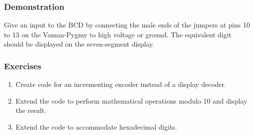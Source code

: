 \subsubsection{Demonstration}
Give an input to the BCD by connecting the male ends of the jumpers at pins 10
to 13 on the Vaman-Pygmy to high voltage or ground. The equivalent digit should
be displayed on the seven-segment display.

\subsubsection{Exercises}
\begin{enumerate}
    \item Create code for an incrementing encoder instead of a display decoder.
    \item Extend the code to perform mathematical operations modulo 10 and
    display the result.
    \item Extend the code to accommodate hexadecimal digits.
\end{enumerate}
